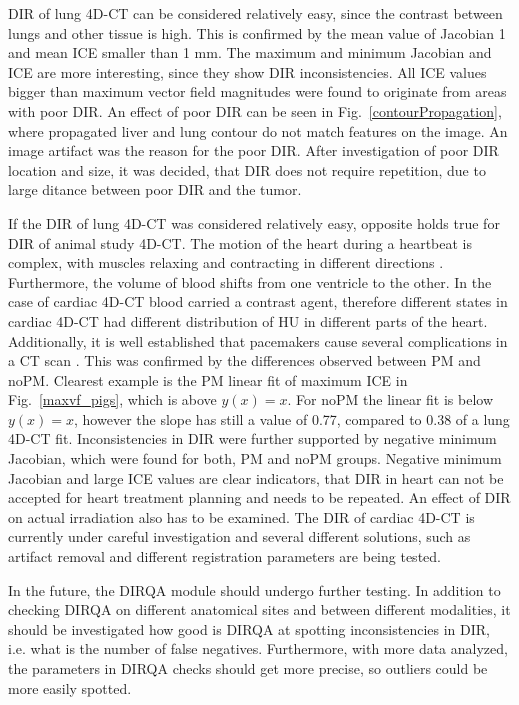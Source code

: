 DIR of lung 4D-CT can be considered relatively easy, since the contrast between lungs and other tissue is high. 
This is confirmed by the mean value of Jacobian 1 and mean ICE smaller than 1 mm. The maximum and minimum Jacobian and ICE are more interesting, since they show 
DIR inconsistencies. All ICE values bigger than maximum vector field magnitudes were found to originate from areas with poor DIR. An effect of poor DIR can be seen in Fig.~\ref{contourPropagation},
where propagated liver and lung contour do not match features on the image. An image artifact was the reason for the poor DIR. After investigation of poor DIR location and size, 
it was decided, that DIR does not require repetition, due to large ditance between poor DIR and the tumor.

If the DIR of lung 4D-CT was considered relatively easy, opposite holds true for DIR of animal study 4D-CT. The motion of the heart during a heartbeat is complex, 
with muscles relaxing and contracting in different directions \cite{Seeley2007}. Furthermore,
the volume of blood shifts from one ventricle to the other. In the case of cardiac 4D-CT blood carried a contrast agent, therefore different states in cardiac 4D-CT 
had different distribution of HU in different parts of the heart. Additionally, it is well established that pacemakers cause several complications in a CT scan \cite{Mak2012}. This was
confirmed by the differences observed between PM and noPM. Clearest example is the PM linear fit of maximum ICE in Fig.~\ref{maxvf_pigs}, which is above $y(x) = x$. For noPM the linear
fit is below $y(x)=x$, however the slope has still a value of 0.77, compared to 0.38 of a lung 4D-CT fit. Inconsistencies in DIR were further supported by negative minimum Jacobian, which were found for both,
PM and noPM groups. Negative minimum Jacobian and large ICE values are clear indicators, that DIR in heart can not be 
accepted for heart treatment planning and needs to be repeated. An effect of DIR on actual irradiation also has to be examined.
The DIR of cardiac 4D-CT is currently under careful investigation
and several different solutions, such as artifact removal and different registration parameters are being tested.

In the future, the DIRQA module should undergo further testing. In addition to checking DIRQA on different anatomical sites and between different modalities, 
it should be investigated how good is DIRQA at spotting inconsistencies in DIR, i.e. what is the number of false negatives. Furthermore, with more
data analyzed, the parameters in DIRQA checks should get more precise, so outliers could be more easily spotted.

